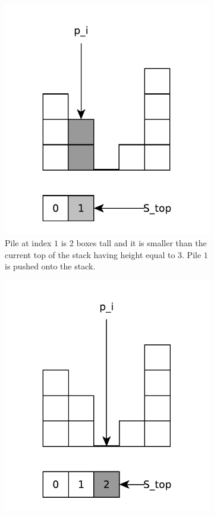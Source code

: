 \begin{figure}
\begin{subfigure}[t]{0.24\textwidth}
		\includegraphics[width=1\linewidth]{sources/trapping_water/images/stack_ex2}
		\caption{Pile  at index $1$ is 2 boxes tall and it is smaller than the current top of the stack having height equal to $3$. Pile $1$ is pushed onto the stack.}
		\label{fig:trapping_water:stack_ex2}
	 \end{subfigure}
	 \hfill
	 \begin{subfigure}[t]{0.24\textwidth}
		\includegraphics[width=1\linewidth]{sources/trapping_water/images/stack_ex3}

\end{subfigure}
\end{figure}
